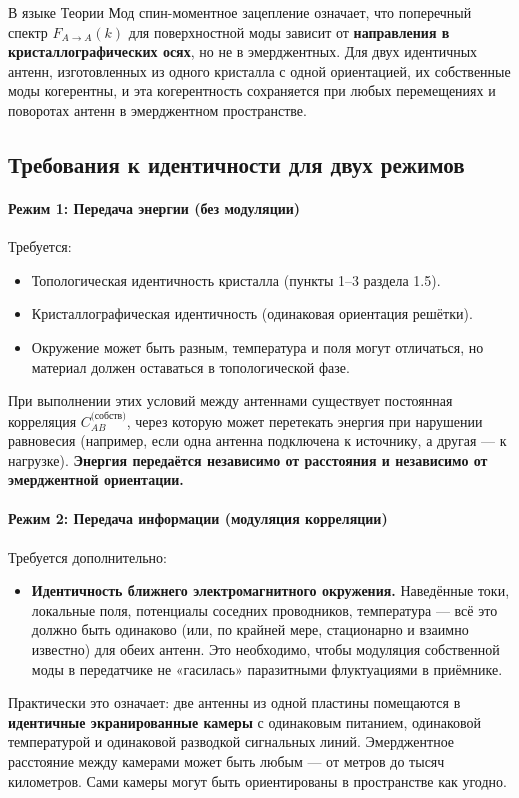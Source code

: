 \documentclass[a4paper,12pt]{article}
\begin{document}
В языке Теории Мод спин-моментное зацепление означает, что поперечный спектр \(F_{A\to A}(k)\) для поверхностной моды зависит от \textbf{направления в кристаллографических осях}, но не в эмерджентных. Для двух идентичных антенн, изготовленных из одного кристалла с одной ориентацией, их собственные моды когерентны, и эта когерентность сохраняется при любых перемещениях и поворотах антенн в эмерджентном пространстве.

\subsection{Требования к идентичности для двух режимов}

\paragraph{Режим 1: Передача энергии (без модуляции)}
Требуется:
\begin{itemize}
    \item Топологическая идентичность кристалла (пункты 1–3 раздела 1.5).
    \item Кристаллографическая идентичность (одинаковая ориентация решётки).
    \item Окружение может быть разным, температура и поля могут отличаться, но материал должен оставаться в топологической фазе.
\end{itemize}
При выполнении этих условий между антеннами существует постоянная корреляция \(C_{AB}^{\text{(собств)}}\), через которую может перетекать энергия при нарушении равновесия (например, если одна антенна подключена к источнику, а другая — к нагрузке). \textbf{Энергия передаётся независимо от расстояния и независимо от эмерджентной ориентации.}

\paragraph{Режим 2: Передача информации (модуляция корреляции)}
Требуется дополнительно:
\begin{itemize}
    \item \textbf{Идентичность ближнего электромагнитного окружения.} Наведённые токи, локальные поля, потенциалы соседних проводников, температура — всё это должно быть одинаково (или, по крайней мере, стационарно и взаимно известно) для обеих антенн. Это необходимо, чтобы модуляция собственной моды в передатчике не «гасилась» паразитными флуктуациями в приёмнике.
\end{itemize}
Практически это означает: две антенны из одной пластины помещаются в \textbf{идентичные экранированные камеры} с одинаковым питанием, одинаковой температурой и одинаковой разводкой сигнальных линий. Эмерджентное расстояние между камерами может быть любым — от метров до тысяч километров. Сами камеры могут быть ориентированы в пространстве как угодно.
\end{document}
